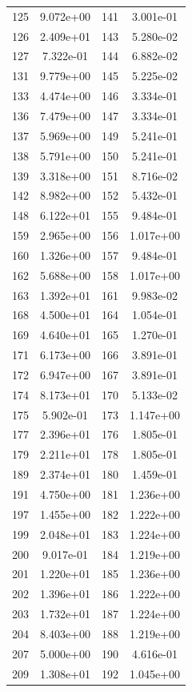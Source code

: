 \documentclass[12pt]{article}
\begin{document}
\begin{longtable}{@{}cccc@{}}
125 & 9.072e+00 & 141 & 3.001e-01 \\
126 & 2.409e+01 & 143 & 5.280e-02 \\
127 & 7.322e-01 & 144 & 6.882e-02 \\
131 & 9.779e+00 & 145 & 5.225e-02 \\
133 & 4.474e+00 & 146 & 3.334e-01 \\
136 & 7.479e+00 & 147 & 3.334e-01 \\
137 & 5.969e+00 & 149 & 5.241e-01 \\
138 & 5.791e+00 & 150 & 5.241e-01 \\
139 & 3.318e+00 & 151 & 8.716e-02 \\
142 & 8.982e+00 & 152 & 5.432e-01 \\
148 & 6.122e+01 & 155 & 9.484e-01 \\
159 & 2.965e+00 & 156 & 1.017e+00 \\
160 & 1.326e+00 & 157 & 9.484e-01 \\
162 & 5.688e+00 & 158 & 1.017e+00 \\
163 & 1.392e+01 & 161 & 9.983e-02 \\
168 & 4.500e+01 & 164 & 1.054e-01 \\
169 & 4.640e+01 & 165 & 1.270e-01 \\
171 & 6.173e+00 & 166 & 3.891e-01 \\
172 & 6.947e+00 & 167 & 3.891e-01 \\
174 & 8.173e+01 & 170 & 5.133e-02 \\
175 & 5.902e-01 & 173 & 1.147e+00 \\
177 & 2.396e+01 & 176 & 1.805e-01 \\
179 & 2.211e+01 & 178 & 1.805e-01 \\
189 & 2.374e+01 & 180 & 1.459e-01 \\
191 & 4.750e+00 & 181 & 1.236e+00 \\
197 & 1.455e+00 & 182 & 1.222e+00 \\
199 & 2.048e+01 & 183 & 1.224e+00 \\
200 & 9.017e-01 & 184 & 1.219e+00 \\
201 & 1.220e+01 & 185 & 1.236e+00 \\
202 & 1.396e+01 & 186 & 1.222e+00 \\
203 & 1.732e+01 & 187 & 1.224e+00 \\
204 & 8.403e+00 & 188 & 1.219e+00 \\
207 & 5.000e+00 & 190 & 4.616e-01 \\
209 & 1.308e+01 & 192 & 1.045e+00 \\

\end{longtable}
\end{document}
